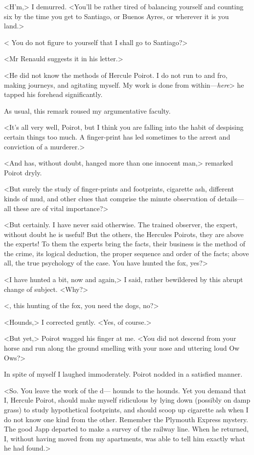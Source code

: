  <H'm,> I demurred. <You'll be rather tired of balancing yourself and counting six by the time you get to Santiago, or Buenos Ayres, or wherever it is you land.> 

 < You do not figure to yourself that I shall go to Santiago?> 

 <Mr Renauld suggests it in his letter.> 

 <He did not know the methods of Hercule Poirot. I do not run to and fro, making journeys, and agitating myself. My work is done from within—\emph{here}\longdash> he tapped his forehead significantly. 

 As usual, this remark roused my argumentative faculty. 

 <It's all very well, Poirot, but I think you are falling into the habit of despising certain things too much. A finger-print has led sometimes to the arrest and conviction of a murderer.> 

 <And has, without doubt, hanged more than one innocent man,> remarked Poirot dryly. 

 <But surely the study of finger-prints and footprints, cigarette ash, different kinds of mud, and other clues that comprise the minute observation of details—all these are of vital importance?> 

 <But certainly. I have never said otherwise. The trained observer, the expert, without doubt he is useful! But the others, the Hercules Poirots, they are above the experts! To them the experts bring the facts, their business is the method of the crime, its logical deduction, the proper sequence and order of the facts; above all, the true psychology of the case. You have hunted the fox, yes?> 

 <I have hunted a bit, now and again,> I said, rather bewildered by this abrupt change of subject. <Why?> 

 <, this hunting of the fox, you need the dogs, no?> 

 <Hounds,> I corrected gently. <Yes, of course.> 

 <But yet,> Poirot wagged his finger at me. <You did not descend from your horse and run along the ground smelling with your nose and uttering loud Ow Ows?> 

 In spite of myself I laughed immoderately. Poirot nodded in a satisfied manner. 

 <So. You leave the work of the d— hounds to the hounds. Yet you demand that I, Hercule Poirot, should make myself ridiculous by lying down (possibly on damp grass) to study hypothetical footprints, and should scoop up cigarette ash when I do not know one kind from the other. Remember the Plymouth Express mystery. The good Japp departed to make a survey of the railway line. When he returned, I, without having moved from my apartments, was able to tell him exactly what he had found.> 

